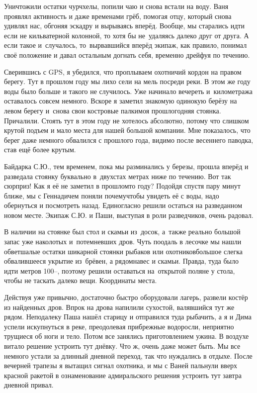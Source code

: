 Уничтожили остатки чурчхелы, попили чаю и снова встали на воду. Ваня проявлял активность и даже временами грёб, помогая отцу, который снова удивлял нас, обгоняя эскадру и вырываясь вперёд. Вообще, мы старались идти если не кильватерной колонной, то хотя бы не~удаляясь далеко друг от друга. А если такое и~случалось, то~вырвавшийся вперёд экипаж, как правило, понимал своё положение и давал остальным догнать себя, временно дрейфуя по течению.

Сверившись с GPS, я убедился, что проплываем охотничий кордон на правом берегу. Тут в прошлом году мы лихо сели на мель посреди реки. В этом же году воды было больше и такого не случилось. Уже начинало вечереть и~километража оставалось совсем немного. Вскоре я заметил знакомую одинокую берёзу на левом берегу и~снова свои костровые палки\mdash моя прошлогодняя стоянка. Причалили. Стоять тут в этом году не хотелось абсолютно, потому что слишком крутой подъем и мало места для нашей большой компании. Мне показалось, что берег даже немного обвалился с прошлого года, видимо после весеннего паводка, став ещё более крутым.

Байдарка С.Ю., тем временем, пока мы разминались у березы, прошла вперёд и разведала стоянку буквально в~двухстах метрах ниже по течению. Вот так сюрприз! Как я её не заметил в прошлом\sdash то году? Подойдя спустя пару минут ближе, мы с Геннадичем поняли почему\mdash чтобы увидеть её с воды, надо обернуться и посмотреть назад. Единогласно решили остаться на разведанном новом месте. Экипаж С.Ю. и Паши, выступая в роли разведчиков, очень радовал. 

В наличии на стоянке был стол и скамьи из~досок, а~также реально большой запас уже наколотых и~потемневших дров. Чуть поодаль в лесочке мы нашли обветшалые остатки шикарной стоянки рыбаков или охотников\mdash  большое слегка обвалившееся укрытие из~брёвен, а рядом\mdash  навес и скамьи. Правда, туда было идти метров 100\thinspace\nobreakdash--, поэтому решили оставаться на~открытой поляне у стола, чтобы не таскать далеко вещи. Координаты места\mdash \CoordsChagodoschaSixteenNearKaban. 

Действуя уже привычно, достаточно быстро оборудовали лагерь, развели костёр из найденных дров. Впрок на дрова напилили сухостой, валявшийся тут же рядом. Неподалеку Паша нашёл старицу и отправился туда рыбачить, а я и Дима успели искупнуться в реке, преодолевая прибрежные водоросли, неприятно трущиеся об ноги и тело. Потом все занялись приготовлением ужина. В воздухе витало решение устроить тут днёвку. Что ж, очень даже может быть. Мы все немного устали за длинный дневной переход, так что нуждались в отдыхе. После вечерней трапезы я вытащил сигнал охотника, и мы с Ваней пальнули вверх красной ракетой в ознаменование адмиральского решения устроить тут завтра дневной привал.

